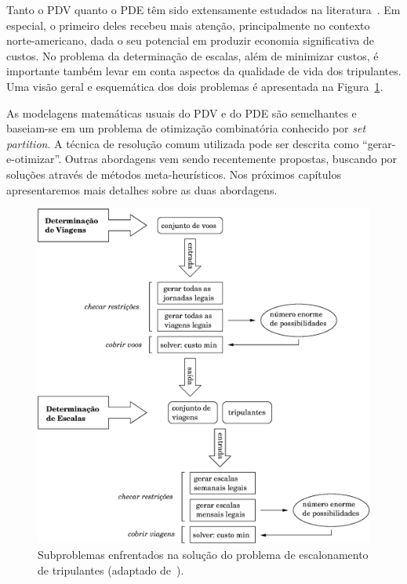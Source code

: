 Tanto o PDV quanto o PDE têm sido extensamente estudados na literatura~\cite{gopalakrishnan05}. Em
especial, o primeiro deles recebeu mais atenção, principalmente no contexto norte-americano, dada o
seu potencial em produzir economia significativa de custos. No problema da determinação de escalas,
além de minimizar custos, é importante também levar em conta aspectos da qualidade de vida dos
tripulantes. Uma visão geral e esquemática dos dois problemas é apresentada na
Figura~\ref{fig:escalonamento}.

As modelagens matemáticas usuais do PDV e do PDE são semelhantes e baseiam-se em um problema de 
otimização combinatória conhecido por \emph{set partition}. A técnica de resolução comum utilizada 
pode ser descrita como ``gerar-e-otimizar''. Outras abordagens vem sendo recentemente propostas, 
buscando por soluções através de métodos meta-heurísticos. Nos próximos capítulos apresentaremos 
mais detalhes sobre as duas abordagens.

\begin{figure}[htbp]
	\begin{center}
		\includegraphics[scale=0.5]{fig/escalonamento.eps}
		\caption{Subproblemas enfrentados na solução do problema de escalonamento de tripulantes 
		(adaptado de~\cite{souai09}).}
		\label{fig:escalonamento}
	\end{center}
\end{figure}


